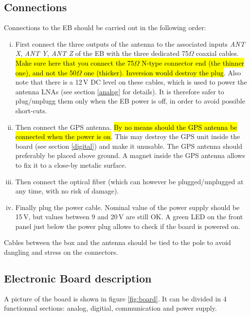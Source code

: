\subsection{Connections}
\label{connection}
Connections to the EB should be carried out in the following order:
\begin{enumerate}[i)]
\item {First connect the three outputs of the antenna to the associated inputs {\it ANT X}, {\it ANT Y}, {\it ANT Z} of the EB with the three dedicated 75$\Omega$ coaxial cables. \hl{Make sure here that you connect the 75$\Omega$ N-type connector end (the thinner one), and not the 50$\Omega$ one (thicker). Inversion would destroy the plug}. Also note that there is a 12\,V DC level on these cables, which is used to power the antenna LNAs (see section \ref{analog} for details). It is therefore safer to plug/unplugg them only when the EB power is off, in order to avoid possible short-cuts. 
}
\item {Then connect the GPS antenna. \hl{By no means should the GPS antenna be connected when the power is on}. This may destroy the GPS unit inside the board (see section \ref{digital}) and make it unusable. The GPS antenna should preferably be placed above ground. A magnet inside the GPS antenna allows to fix it to a close-by metalic surface. }
\item {Then connect the optical fiber (which can however be plugged/unplugged at any time, with no risk of damage). }
\item {Finally plug the power cable. Nominal value of the power supply should be 15\,V, but values between 9 and 20\,V are still OK. A green LED on the front panel just below the power plug allows to check if the board is powered on.}
\end{enumerate}

Cables between the box and the antenna should be tied to the pole to avoid dangling and stress on the connectors.

\subsection{Electronic Board description}
A picture of the board is shown in figure \ref{fig:board}. It can be divided in 4 functionnal sections: analog, digitial, communication and power supply.

